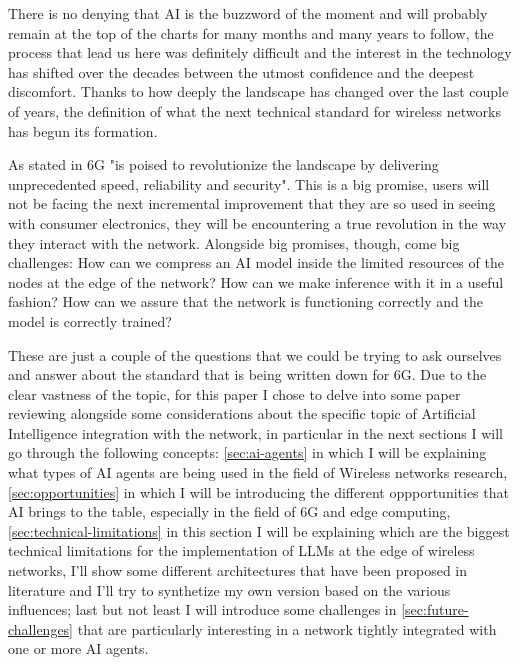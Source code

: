 

There is no denying that AI is the buzzword of the moment and will probably remain at the top of the
charts for many months and many years to follow, the process that lead us here was definitely
difficult and the interest in the technology has shifted over the decades between the utmost
confidence and the deepest discomfort. Thanks to how deeply the landscape has changed over the last
couple of years, the definition of what the next technical standard for wireless networks has begun
its formation.

As stated in \cite{6ainets} 6G "is poised to revolutionize the landscape by delivering
unprecedented speed, reliability and security". This is a big promise, users will not be facing the
next incremental improvement that they are so used in seeing with consumer electronics, they will be
encountering a true revolution in the way they interact with the network. Alongside big promises,
though, come big challenges: How can we compress an AI model inside the limited resources of the
nodes at the edge of the network? How can we make inference with it in a useful fashion? How can we
assure that the network is functioning correctly and the model is correctly trained?

These are just a couple of the questions that we could be trying to ask ourselves and answer about
the standard that is being written down for 6G. Due to the clear vastness of the topic, for this
paper I chose to delve into some paper reviewing alongside some considerations about the specific
topic of Artificial Intelligence integration with the network, in particular in the next sections I
will go through the following concepts: \ref{sec:ai-agents} in which I will be explaining what types
of AI agents are being used in the field of Wireless networks research, \ref{sec:opportunities} in
which I will be introducing the different oppportunities that AI brings to the table, especially in
the field of 6G and edge computing, \ref{sec:technical-limitations} in this section I will be
explaining which are the biggest technical limitations for the implementation of LLMs at the edge of
wireless networks, I'll show some different architectures that have been proposed in literature and
I'll try to synthetize my own version based on the various influences; last but not least I will
introduce some challenges in \ref{sec:future-challenges} that are particularly interesting in a
network tightly integrated with one or more AI agents.

